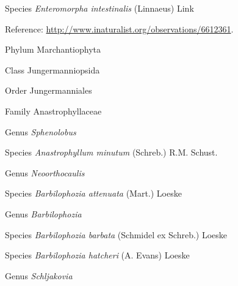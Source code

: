 \documentclass[9pt, article]{memoir}
\begin{document}
\begin{multicols}{2}
\vspace{6pt}\noindent\hspace{36pt}Species \textit{Enteromorpha intestinalis} (Linnaeus) Link


\vspace{6pt}Reference: 
\url{http://www.inaturalist.org/observations/6612361}.

\vspace{6pt}\noindent\hspace{6pt}Phylum Marchantiophyta


\vspace{6pt}\noindent\hspace{12pt}Class Jungermanniopsida


\vspace{6pt}\noindent\hspace{18pt}Order Jungermanniales


\vspace{6pt}\noindent\hspace{24pt}Family Anastrophyllaceae


\vspace{6pt}\noindent\hspace{30pt}Genus \textit{Sphenolobus}


\vspace{6pt}\noindent\hspace{36pt}Species \textit{Anastrophyllum minutum} (Schreb.) R.M. Schust.


\vspace{6pt}\noindent\hspace{30pt}Genus \textit{Neoorthocaulis}


\vspace{6pt}\noindent\hspace{36pt}Species \textit{Barbilophozia attenuata} (Mart.) Loeske


\vspace{6pt}\noindent\hspace{30pt}Genus \textit{Barbilophozia}


\vspace{6pt}\noindent\hspace{36pt}Species \textit{Barbilophozia barbata} (Schmidel ex Schreb.) Loeske


\vspace{6pt}\noindent\hspace{36pt}Species \textit{Barbilophozia hatcheri} (A. Evans) Loeske


\vspace{6pt}\noindent\hspace{30pt}Genus \textit{Schljakovia}



\end{multicols}
\end{document}
